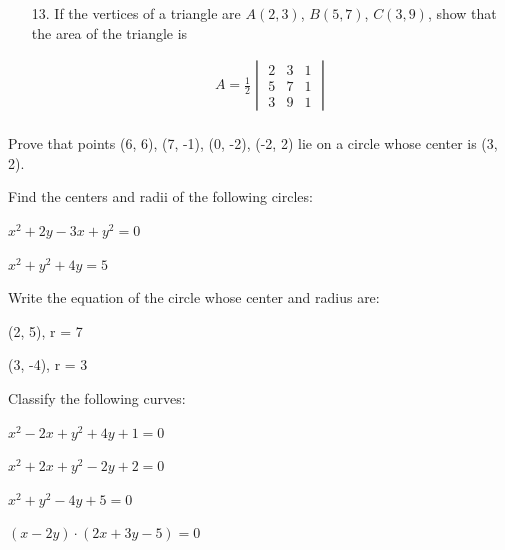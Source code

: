 \documentclass[11pt]{amsbook}
\begin{document}
\begin{enumerate}
    \item [13.] If the vertices of a triangle are $A(2, 3)$, $B(5, 7)$, $C(3, 9)$, show
    that the area of the triangle is


\begin{align*}
	A = \frac{1}{2} 
	\begin{vmatrix} 2 & 3 & 1 \\ 5 & 7 & 1 \\ 3 & 9 & 1 \end{vmatrix}\\
\end{align*}
\end{enumerate}
\begin{hEnumerateArabic}
\setcounter{enumi}{13}
	\item Prove that points (6, 6), (7, -1), (0, -2), (-2, 2) lie on a circle whose center is (3, 2).\\
	\item Find the centers and radii of the following circles:
		\begin{hEnumerateAlpha} 
			\begin{multicols}{2}
				\item $x^2+2y - 3x + y^2=0$
			\columnbreak
				\item $x^2 + y^2 + 4y =5$
			\end{multicols}
		\end{hEnumerateAlpha}
	\item Write the equation of the circle whose center and radius are:
		\begin{hEnumerateAlpha}
			\begin{multicols}{2}
				\item (2, 5), \: r = 7
			\columnbreak
				\item (3, -4), \:  r = 3
			\end{multicols}
		\end{hEnumerateAlpha}
	\item Classify the following curves:
		\begin{hEnumerateAlpha}
			\begin{multicols}{2}
				\item $x^2 -2x +y^2 + 4y +1 =0$
				\item $x^2 +2x +y^2 -2y +2=0$
			\columnbreak
				\item $x^2 +y^2 - 4y +5 =0$
				\item $(x-2y) \cdot (2x+3y -5)=0$
			\end{multicols}
		\end{hEnumerateAlpha}

\end{hEnumerateArabic}
\end{document}
